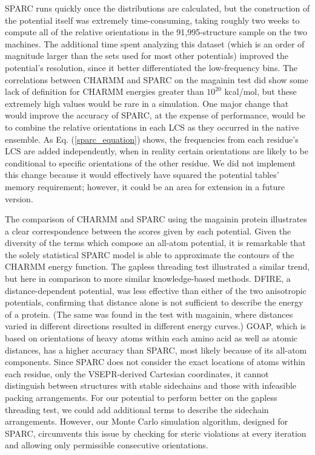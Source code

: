 \documentclass[11pt,titlepage]{article}
\begin{document}
SPARC runs quickly once the distributions are calculated, but the construction of the potential itself was extremely time-consuming, taking roughly two weeks to compute all of the relative orientations in the 91,995-structure sample on the two machines.
The additional time spent analyzing this dataset (which is an order of magnitude larger than the sets used for most other potentials) improved the potential's resolution, since it better differentiated the low-frequency bins.
The correlations between CHARMM and SPARC on the magainin test did show some lack of definition for CHARMM energies greater than $10^{20}$ kcal/mol, but these extremely high values would be rare in a simulation.
One major change that would improve the accuracy of SPARC, at the expense of performance, would be to combine the relative orientations in each LCS as they occurred in the native ensemble.
As Eq. (\ref{sparc_equation}) shows, the frequencies from each residue's LCS are added independently, when in reality certain orientations are likely to be conditional to specific orientations of the other residue.
We did not implement this change because it would effectively have squared the potential tables' memory requirement; however, it could be an area for extension in a future version.

The comparison of CHARMM and SPARC using the magainin protein illustrates a clear correspondence between the scores given by each potential.
Given the diversity of the terms which compose an all-atom potential, it is remarkable that the solely statistical SPARC model is able to approximate the contours of the CHARMM energy function.
The gapless threading test illustrated a similar trend, but here in comparison to more similar knowledge-based methods.
DFIRE, a distance-dependent potential, was less effective than either of the two anisotropic potentials, confirming that distance alone is not sufficient to describe the energy of a protein.
(The same was found in the test with magainin, where distances varied in different directions resulted in different energy curves.)
GOAP, which is based on orientations of heavy atoms within each amino acid as well as atomic distances, has a higher accuracy than SPARC, most likely because of its all-atom components.
Since SPARC does not consider the exact locations of atoms within each residue, only the VSEPR-derived Cartesian coordinates, it cannot distinguish between structures with stable sidechains and those with infeasible packing arrangements.
For our potential to perform better on the gapless threading test, we could add additional terms to describe the sidechain arrangements.
However, our Monte Carlo simulation algorithm, designed for SPARC, circumvents this issue by checking for steric violations at every iteration and allowing only permissible consecutive orientations.
\end{document}
